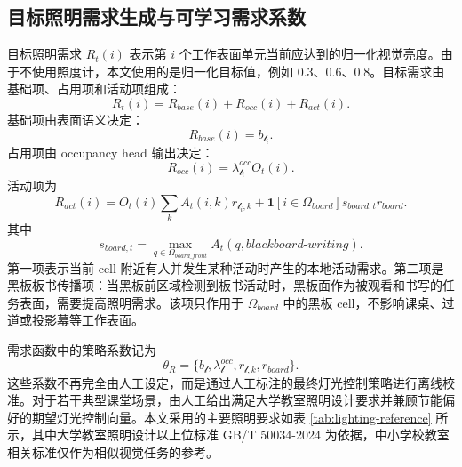 \documentclass[UTF8,a4paper,zihao=-4]{ctexart}
\begin{document}
\subsection{目标照明需求生成与可学习需求系数}

目标照明需求 $R_t(i)$ 表示第 $i$ 个工作表面单元当前应达到的归一化视觉亮度。由于不使用照度计，本文使用的是归一化目标值，例如 0.3、0.6、0.8。目标需求由基础项、占用项和活动项组成：
\begin{equation}
R_t(i)=R_{base}(i)+R_{occ}(i)+R_{act}(i).
\end{equation}
基础项由表面语义决定：
\begin{equation}
R_{base}(i)=b_{\mathcal{l}_i}.
\end{equation}
占用项由 occupancy head 输出决定：
\begin{equation}
R_{occ}(i)=\lambda_{\mathcal{l}_i}^{occ}O_t(i).
\end{equation}
活动项为
\begin{equation}
R_{act}(i)=O_t(i)\sum_k A_t(i,k)r_{\mathcal{l}_i,k}+\mathbf{1}[i\in\Omega_{board}]s_{board,t}r_{board}.
\end{equation}
其中
\begin{equation}
s_{board,t}=\max_{q\in\Omega_{board\_front}}A_t(q,blackboard\text{-}writing).
\end{equation}
第一项表示当前 cell 附近有人并发生某种活动时产生的本地活动需求。第二项是黑板板书传播项：当黑板前区域检测到板书活动时，黑板面作为被观看和书写的任务表面，需要提高照明需求。该项只作用于 $\Omega_{board}$ 中的黑板 cell，不影响课桌、过道或投影幕等工作表面。

需求函数中的策略系数记为
\begin{equation}
\theta_R=\{b_{\mathcal{l}},\lambda_{\mathcal{l}}^{occ},r_{\mathcal{l},k},r_{board}\}.
\end{equation}
这些系数不再完全由人工设定，而是通过人工标注的最终灯光控制策略进行离线校准。对于若干典型课堂场景，由人工给出满足大学教室照明设计要求并兼顾节能偏好的期望灯光控制向量。本文采用的主要照明要求如表 \ref{tab:lighting-reference} 所示，其中大学教室照明设计以上位标准 GB/T 50034-2024 为依据，中小学校教室相关标准仅作为相似视觉任务的参考\cite{gbt50034-2024,gb7793-2010,gb7793-2025,gbt36876-2018}。
\end{document}
